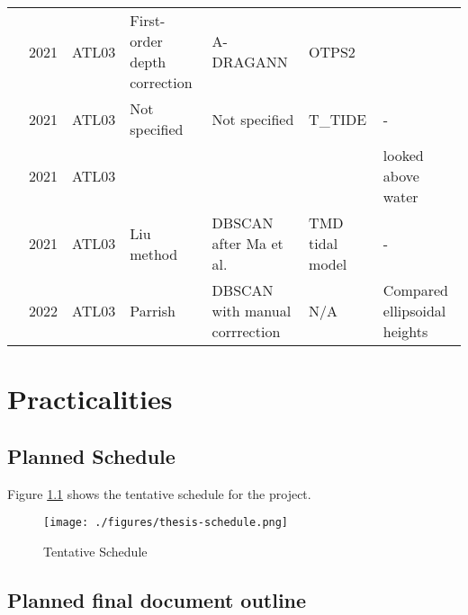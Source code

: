 \begin{landscape}
\begin{table}
\begin{tabular}{p{3.7cm}llp{3.2cm}p{3.5cm}ll}
                  \citeauthor{Cao2021}               & 2021 & ATL03   & First-order depth correction  & A-DRAGANN                      & OTPS2           &                              \\
                  \citeauthor{Lee2021}               & 2021 & ATL03   & Not specified                 & Not specified                  & T\_TIDE         & -                            \\
                  \citeauthor{Xu2022a}               & 2021 & ATL03   &                               &                                &                 & looked above water           \\
                  \citeauthor{Liu2021}               & 2021 & ATL03   & Liu method                    & DBSCAN after Ma et al.         & TMD tidal model & -                            \\
                  \citeauthor{LeQuilleuc2022b}       & 2022 & ATL03   & Parrish                       & DBSCAN with manual corrrection & N/A             & Compared ellipsoidal heights \\
                  \bottomrule
            \end{tabular}
      \end{table}

\end{landscape}
\restoregeometry

\chapter{Practicalities}

\section{Planned Schedule}

Figure \ref{project-schedule} shows the tentative schedule for the project.
\begin{landscape}

      \begin{figure}
            \centering
            \texttt{[image: ./figures/thesis-schedule.png]}
            \caption{Tentative Schedule}
            \label{project-schedule}
      \end{figure}

\end{landscape}
\section{Planned final document outline}
